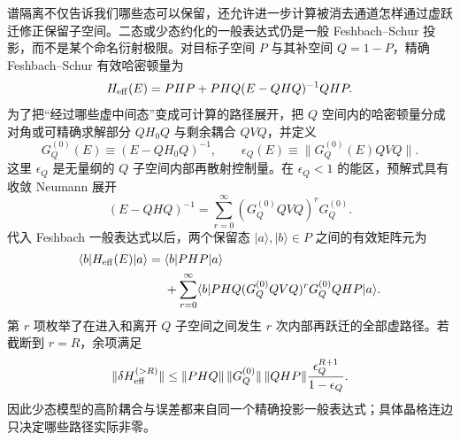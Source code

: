 谱隔离不仅告诉我们哪些态可以保留，还允许进一步计算被消去通道怎样通过虚跃迁修正保留子空间。二态或少态约化的一般表达式仍是一般 Feshbach--Schur 投影，而不是某个命名衍射极限。对目标子空间 $P$ 与其补空间 $Q=1-P$，精确 Feshbach--Schur 有效哈密顿量为
\begin{equation*}
 H_{\rm eff}(E)
 =PHP+PHQ(E-QHQ)^{-1}QHP.
\end{equation*}
为了把“经过哪些虚中间态”变成可计算的路径展开，把 $Q$ 空间内的哈密顿量分成对角或可精确求解部分 $QH_0Q$ 与剩余耦合 $QVQ$，并定义
\begin{equation}
 {
 G_Q^{(0)}(E)\equiv(E-QH_0Q)^{-1},
 \qquad
 \epsilon_Q(E)\equiv\|G_Q^{(0)}(E)QVQ\|.}
 \label{eq:virtual-path-resolvent-control-dp85}
\end{equation}
这里 $\epsilon_Q$ 是无量纲的 $Q$ 子空间内部再散射控制量。在 $\epsilon_Q<1$ 的能区，预解式具有收敛 Neumann 展开
\begin{equation}
 {
 (E-QHQ)^{-1}
 =\sum_{r=0}^{\infty}\left(G_Q^{(0)}QVQ\right)^rG_Q^{(0)}.}
 \label{eq:virtual-path-neumann-dp85}
\end{equation}
代入 Feshbach 一般表达式以后，两个保留态 $|a\rangle,|b\rangle\in P$ 之间的有效矩阵元为
\begin{equation}
 {
 \begin{aligned}
 \langle b|H_{\rm eff}(E)|a\rangle
 ={}&\langle b|PHP|a\rangle\\
 &+\sum_{r=0}^{\infty}
 \langle b|PHQ
 (G_Q^{(0)}QVQ)^rG_Q^{(0)}QHP|a\rangle .
 \end{aligned}}
 \label{eq:virtual-path-general-series-dp85}
\end{equation}
第 $r$ 项枚举了在进入和离开 $Q$ 子空间之间发生 $r$ 次内部再跃迁的全部虚路径。若截断到 $r=R$，余项满足
\begin{equation}
 {
 \|\delta H_{\rm eff}^{(>R)}\|
 \le
 \|PHQ\|\,\|G_Q^{(0)}\|\,\|QHP\|
 \frac{\epsilon_Q^{R+1}}{1-\epsilon_Q}.}
 \label{eq:virtual-path-remainder-bound-dp85}
\end{equation}
因此少态模型的高阶耦合与误差都来自同一个精确投影一般表达式；具体晶格连边只决定哪些路径实际非零。

